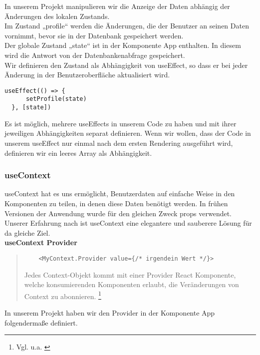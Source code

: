 In unserem Projekt manipulieren wir die Anzeige der Daten abhängig der Änderungen des lokalen Zustands.\\
Im Zustand „profile“ werden die Änderungen, die der Benutzer an seinen Daten vornimmt, bevor sie in der Datenbank gespeichert werden.
\\
Der globale Zustand „state“ ist in der Komponente App enthalten.
In diesem wird die Antwort von der Datenbankenabfrage gespeichert.
\\
Wir definieren den Zustand als Abhängigkeit von useEffect, so dass er bei jeder Änderung in der Benutzeroberfläche aktualisiert wird.
\\
\begin{lstlisting}
useEffect(() => { 
      setProfile(state)      
  }, [state])           
\end{lstlisting}

Es ist möglich, mehrere useEffects in unserem Code zu haben und mit ihrer jeweiligen Abhängigkeiten separat definieren.
Wenn wir wollen, dass der Code in unserem useEffect nur einmal nach dem ersten Rendering ausgeführt wird, definieren wir ein leeres Array als Abhängigkeit.

\subsubsection{useContext}
useContext hat es uns ermöglicht, Benutzerdaten auf einfache Weise in den Komponenten zu teilen, in denen diese Daten benötigt werden. In frühen Versionen der Anwendung wurde für den gleichen Zweck props verwendet.
Unserer Erfahrung nach ist useContext eine elegantere und sauberere Lösung für da gleiche Ziel.
\\
\textbf{useContext Provider} \\

\begin{quote}
    \begin{lstlisting}
    <MyContext.Provider value={/* irgendein Wert */}>
    \end{lstlisting}

    Jedes Context-Objekt kommt mit einer Provider React Komponente, welche konsumierenden Komponenten erlaubt, die Veränderungen von Context zu abonnieren.
    \footnote{Vgl. u.a. \cite{R02}}
    \end{quote}

In unserem Projekt haben wir den Provider in der Komponente App folgendermaße definiert.

